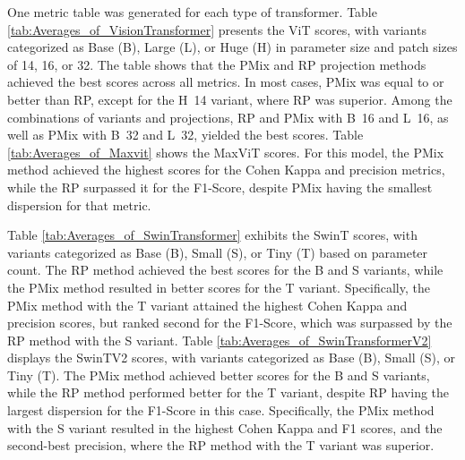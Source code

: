 \documentclass[final,3p,times,twocolumn]{elsarticle}
\begin{document}
One metric table was generated for each type of transformer.
Table \ref{tab:Averages_of_VisionTransformer} presents the \gls{ViT} scores, with variants categorized as Base (B), Large (L), or Huge (H) in parameter size and patch sizes of 14, 16, or 32. The table shows that the \gls{PMix} and \gls{RP} projection methods achieved the best scores across all metrics. In most cases, \gls{PMix} was equal to or better than \gls{RP}, except for the \mbox{H 14} variant, where \gls{RP} was superior. Among the combinations of variants and projections, \gls{RP} and \gls{PMix} with \mbox{B 16} and \mbox{L 16}, as well as \gls{PMix} with \mbox{B 32} and \mbox{L 32}, yielded the best scores.
Table \ref{tab:Averages_of_Maxvit} shows the \gls{MaxViT} scores.  For this model, the \gls{PMix} method achieved the highest scores for the Cohen Kappa and precision metrics, while the \gls{RP} surpassed it for the F1-Score, despite \gls{PMix} having the smallest dispersion for that metric.

Table \ref{tab:Averages_of_SwinTransformer} exhibits the \gls{SwinT} scores, with variants categorized as Base (B), Small (S), or Tiny (T) based on parameter count. The \gls{RP} method achieved the best scores for the B and S variants, while the \gls{PMix} method resulted in better scores for the T variant. Specifically, the \gls{PMix} method with the T variant attained the highest Cohen Kappa and precision scores, but ranked second for the F1-Score, which was surpassed by the \gls{RP} method with the S variant.
Table \ref{tab:Averages_of_SwinTransformerV2} displays the \gls{SwinTV2} scores, with variants categorized as Base (B), Small (S), or Tiny (T). The \gls{PMix} method achieved better scores for the B and S variants, while the \gls{RP} method performed better for the T variant, despite \gls{RP} having the largest dispersion for the F1-Score in this case. Specifically, the \gls{PMix} method with the S variant resulted in the highest Cohen Kappa and F1 scores, and the second-best precision, where the \gls{RP} method with the T variant was superior.
\end{document}
